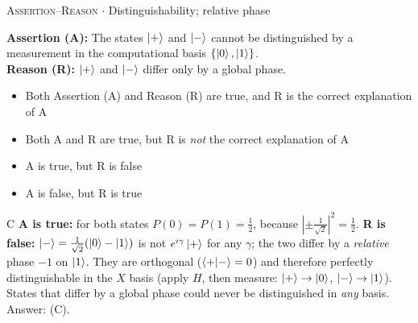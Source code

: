 \documentclass[11pt,a4paper]{article}
\newcommand{\optlabel}[1]{\textbf{(#1)}}
\newcommand{\correctlabel}[1]{\textcolor{okgreen}{\textbf{(#1)}\,\ding{51}}}
\newenvironment{qitem}[1]{\begin{list}{}{\setlength{\leftmargin}{3.3em}\setlength{\labelwidth}{3.1em}%
  \setlength{\labelsep}{0.2em}\setlength{\topsep}{3pt}\setlength{\parsep}{3pt}}\item[\textbf{Q.#1}\hfill]}{\end{list}}
\newcommand{\qsep}{\par\vspace{2pt}{\color{black!15}\hrule}\vspace{4pt}}
\newcommand{\qmeta}[2]{{\footnotesize\color{black!60}\textsc{#1} \;$\cdot$\; #2}\par}
\begin{document}
\begin{qitem}{37}
\qmeta{Assertion--Reason}{Distinguishability; relative phase}
\textbf{Assertion (A):} The states $\ket{+}$ and $\ket{-}$ cannot be distinguished by a measurement in the computational
basis $\{\ket0, \ket1\}$.\\[1mm]
\textbf{Reason (R):} $\ket{+}$ and $\ket{-}$ differ only by a global phase.
\begin{itemize}[leftmargin=2.6em, labelsep=0.4em, itemsep=2pt, topsep=3pt]
\item[\optlabel{A}] Both Assertion (A) and Reason (R) are true, and R is the correct explanation of A
\item[\optlabel{B}] Both A and R are true, but R is \emph{not} the correct explanation of A
\item[\correctlabel{C}] A is true, but R is false
\item[\optlabel{D}] A is false, but R is true
\end{itemize}
\end{qitem}
\begin{solbox}{C}
\textbf{A is true:} for both states $P(0) = P(1) = \frac12$, because $|\pm\frac{1}{\sqrt2}|^2 = \frac12$.
\textbf{R is false:} $\ket{-} = \frac{1}{\sqrt2}(\ket0 - \ket1)$ is not $e^{i\gamma}\ket{+}$ for any $\gamma$; the two differ by a
\emph{relative} phase $-1$ on $\ket1$. They are orthogonal ($\braket{+|-} = 0$) and therefore perfectly distinguishable in the
$X$ basis (apply $H$, then measure: $\ket{+}\to\ket0$, $\ket-\to\ket1$). States that differ by a global phase could never be
distinguished in \emph{any} basis. Answer: (C).
\end{solbox}
\qsep
\end{document}
